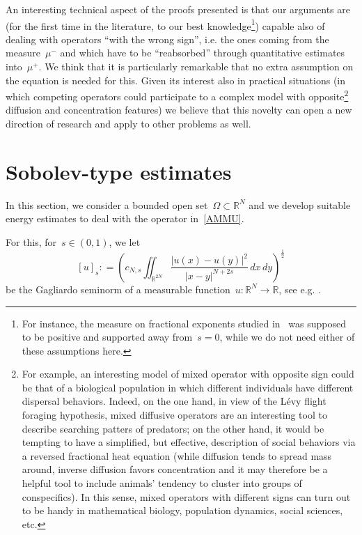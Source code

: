 \documentclass[12pt,a4paper,intlimits,sumlimits]{amsart}
\def \R {\mathbb{R}}
\theoremstyle{definition}
\theoremstyle{plain}
\numberwithin{equation}{section}
\begin{document}
An interesting technical aspect of the proofs presented is that
our arguments are (for the first time in the literature, to our best knowledge\footnote{For instance, the measure on fractional exponents studied in~\cite{MR3485125} was supposed to be positive and supported away from~$s=0$, while we do not need either of these assumptions here.}) capable also of dealing with operators ``with the wrong sign'', i.e. the ones coming from the measure~$\mu^-$
and which have to be ``reabsorbed'' through quantitative estimates into~$\mu^+$.
We think that it is particularly remarkable that no extra assumption on the equation is needed for this. Given its interest also in practical situations (in which competing operators could participate to a complex model with opposite\footnote{For example, an interesting model of mixed operator with opposite sign could be that of a biological population in which different individuals have different dispersal behaviors. Indeed, on the one hand, in view of the L\'evy flight foraging hypothesis,
mixed diffusive operators are an interesting tool to describe searching patters of predators; on the other hand, it would be tempting to have a simplified, but effective, description of social behaviors via a reversed fractional heat equation (while diffusion tends to spread mass around, inverse diffusion favors concentration and it may therefore be a helpful tool to include animals' tendency to cluster into groups of conspecifics). In this sense, mixed operators with different signs can turn out to be handy in mathematical biology, population dynamics, social sciences, etc.} diffusion and concentration features)
we believe that this novelty can open a new direction of research and apply to other problems as well.

\section{Sobolev-type estimates}\label{op_section}
In this section, we consider a bounded open set~$\Omega\subset\R^N$
and we develop suitable energy estimates to deal with the operator in~\eqref{AMMU}.

For this, for~$s\in(0,1)$, we let
\begin{equation}\label{semisp}
[u]_{s}: = \left({c_{N,s}}\iint_{\R^{2N}} \frac{|u(x) - u(y)|^2}{|x - y|^{N+2s}}\, dx\, dy\right)^{\frac12}
\end{equation}
be the Gagliardo seminorm of a measurable function~$u : \R^N \to \R$, see e.g. \cite{MR2944369}.
\end{document}
